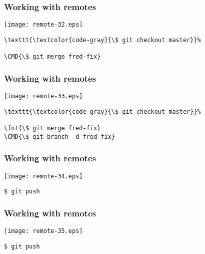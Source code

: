 \documentclass[english]{beamer}
\newcommand{\CMD}[1]{%
\texttt{\textcolor{code-green}{#1}}%
}
\newcommand{\fnt}[1]{%
\texttt{\textcolor{code-gray}{#1}}%
}
\begin{document}
\begin{frame}[fragile]
\frametitle{Working with remotes}

\texttt{[image: remote-32.eps]}

\begin{Verbatim}[commandchars=\\\{\}]
\fnt{\$ git checkout master}
\CMD{\$ git merge fred-fix}
\end{Verbatim}

\vspace{\textheight}
\end{frame}

\begin{frame}[fragile]
\frametitle{Working with remotes}

\texttt{[image: remote-33.eps]}

\begin{Verbatim}[commandchars=\\\{\}]
\fnt{\$ git checkout master}
\fnt{\$ git merge fred-fix}
\CMD{\$ git branch -d fred-fix}
\end{Verbatim}

\vspace{\textheight}
\end{frame}

\begin{frame}[fragile]
\frametitle{Working with remotes}

\texttt{[image: remote-34.eps]}

\begin{center}
\CMD{\$ git push}
\end{center}

\vspace{\textheight}
\end{frame}

\begin{frame}[fragile]
\frametitle{Working with remotes}

\texttt{[image: remote-35.eps]}

\begin{center}
\CMD{\$ git push}
\end{center}

\vspace{\textheight}
\end{frame}
\end{document}
